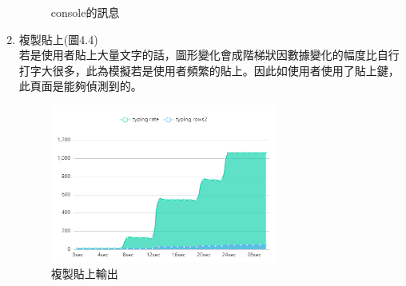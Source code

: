 \begin{enumerate}[1.]
\begin{figure}[H]
		\caption{console的訊息} 
		\label{Fig.4.3} 
	\end{figure}
	\item 複製貼上(圖4.4)\\
	若是使用者貼上大量文字的話，圖形變化會成階梯狀因數據變化的幅度比自行打字大很多，此為模擬若是使用者頻繁的貼上。因此如使用者使用了貼上鍵，此頁面是能夠偵測到的。
	\begin{figure}[H] 
		\centering 
		\includegraphics[width=0.7\textwidth]{4_4.png} 
		\caption{複製貼上輸出} 
		\label{Fig.4.4} 
	\end{figure}
\end{enumerate}
